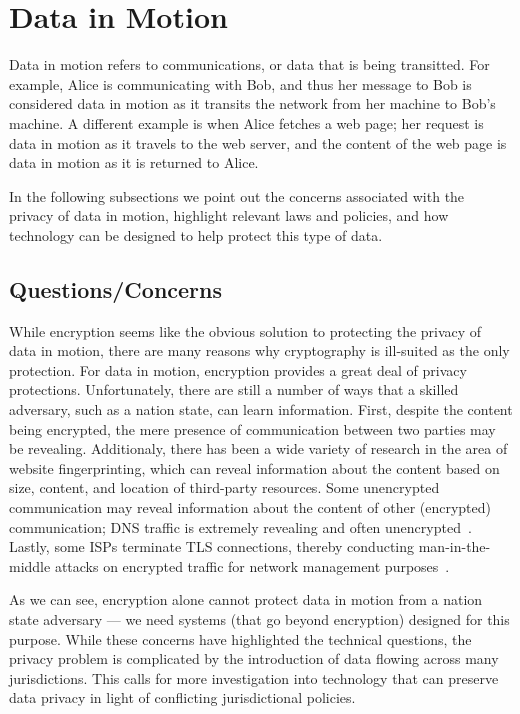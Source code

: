 \section{Data in Motion}
\label{sec:motion}

Data in motion refers to communications, or data that is being transitted.  For example, Alice is communicating with Bob, and thus her message to Bob is considered data in motion as it transits the network from her machine to Bob's machine.  A different example is when Alice fetches a web page; her request is data in motion as it travels to the web server, and the content of the web page is data in motion as it is returned to Alice.

In the following subsections we point out the concerns associated with the privacy of data in motion, highlight relevant laws and policies, and how technology can be designed to help protect this type of data.

\subsection{Questions/Concerns}
While encryption seems like the obvious solution to protecting the privacy of data in motion, there are many reasons why cryptography is ill-suited as the only protection.  For data in motion, encryption provides a great deal of privacy protections.  Unfortunately, there are still a number of ways that a skilled adversary, such as a nation state, can learn information.  First, despite the content being encrypted, the mere presence of communication between two parties may be revealing.  Additionaly, there has been a wide variety of research in the area of website fingerprinting, which can reveal information about the content based on size, content, and location of third-party resources.  Some unencrypted communication may reveal information about the content of other (encrypted) communication; DNS traffic is extremely revealing and often unencrypted~\cite{isps_see}.  Lastly, some ISPs terminate TLS connections, thereby conducting man-in-the-middle attacks on encrypted traffic for network management purposes~\cite{gogo}.

As we can see, encryption alone cannot protect data in motion from a nation state adversary --- we need systems (that go beyond encryption) designed for this purpose.  While these concerns have highlighted the technical questions, the privacy problem is complicated by the introduction of data flowing across many jurisdictions.  This calls for more investigation into technology that can preserve data privacy in light of conflicting jurisdictional policies.

